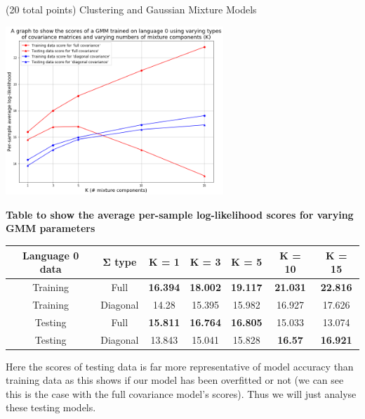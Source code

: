\documentclass[12pt]{article}
\begin{document}
\begin{question}{(20 total points) Clustering and Gaussian Mixture Models}
\begin{subquestion}
      \begin{answerbox}{30em}
        \scriptsize{
        \begin{center}
        \includegraphics[width=0.615\textwidth]{images/q35.png}
        \end{center}
        \begin{center}
        \textbf{Table to show the average per-sample log-likelihood scores for varying GMM parameters}\\
        \vspace{0.07cm}
        \begin{tabular}{ |c|c|c|c|c|c|c| } \hline
        \textbf{Language 0 data} & \textbf{$\mathbf{\Sigma}$ type} & \textbf{K = 1} & \textbf{K = 3} & \textbf{K = 5} & \textbf{K = 10} & \textbf{K = 15} \\ \hline
        Training & Full & \textbf{\textcolor{OliveGreen}{16.394}} & \textbf{\textcolor{OliveGreen}{18.002}} & \textbf{\textcolor{OliveGreen}{19.117}} & \textbf{\textcolor{OliveGreen}{21.031}} & \textbf{\textcolor{OliveGreen}{22.816}} \\
        Training & Diagonal & 14.28 & 15.395 & 15.982 & 16.927 & 17.626 \\ \hline
        Testing & Full & \textbf{\textcolor{OliveGreen}{15.811}} & \textbf{\textcolor{OliveGreen}{16.764}} & \textbf{\textcolor{OliveGreen}{16.805}} & 15.033 & 13.074 \\ 
        Testing & Diagonal & 13.843 & 15.041 & 15.828 & \textbf{\textcolor{OliveGreen}{16.57}} & \textbf{\textcolor{OliveGreen}{16.921}} \\ \hline
        \end{tabular}
        \end{center}
        Here the scores of testing data is far more representative of model accuracy than training data as this shows if our model has been overfitted or not (we can see this is the case with the full covariance model's scores). Thus we will just analyse these testing models.
}
\end{answerbox}
\end{subquestion}
\end{question}
\end{document}

